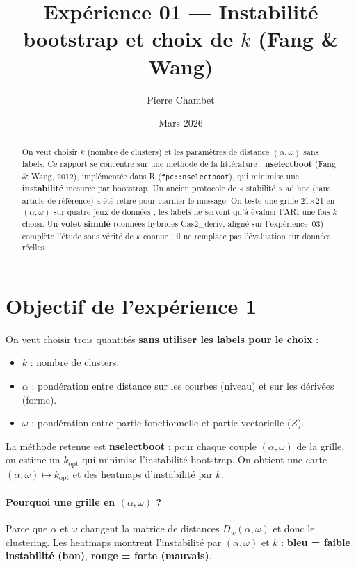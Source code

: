 \documentclass[11pt, a4paper]{article}
\title{Expérience 01 --- Instabilité bootstrap et choix de $k$ (Fang \& Wang)}
\author{Pierre Chambet}
\date{Mars 2026}
\begin{document}
\maketitle

\begin{abstract}
On veut choisir $k$ (nombre de clusters) et les paramètres de distance
$(\alpha,\omega)$ sans labels. Ce rapport se concentre sur une méthode de la
littérature : \textbf{nselectboot} (Fang \& Wang, 2012), implémentée dans R
(\texttt{fpc::nselectboot}), qui minimise une \textbf{instabilité} mesurée par
bootstrap. Un ancien protocole de « stabilité » ad hoc (sans article de référence)
a été retiré pour clarifier le message. On teste une grille 21×21 en
$(\alpha,\omega)$ sur quatre jeux de données ; les labels ne servent qu'à
évaluer l'ARI une fois $k$ choisi. Un \textbf{volet simulé} (données hybrides
Cas2\_deriv, aligné sur l'expérience~03) complète l'étude sous vérité de $k$
connue ; il ne remplace pas l'évaluation sur données réelles.
\end{abstract}

\tableofcontents
\newpage

\section{Objectif de l'expérience 1}

On veut choisir trois quantités \textbf{sans utiliser les labels pour le choix} :

\begin{itemize}
  \item \textbf{$k$} : nombre de clusters.
  \item \textbf{$\alpha$} : pondération entre distance sur les courbes (niveau)
    et sur les dérivées (forme).
  \item \textbf{$\omega$} : pondération entre partie fonctionnelle et partie
    vectorielle ($Z$).
\end{itemize}

La méthode retenue est \textbf{nselectboot} : pour chaque couple $(\alpha,\omega)$
de la grille, on estime un $k_\text{opt}$ qui minimise l'instabilité bootstrap.
On obtient une carte $(\alpha,\omega) \mapsto k_\text{opt}$ et des heatmaps
d'instabilité par $k$.

\paragraph{Pourquoi une grille en $(\alpha,\omega)$ ?}
Parce que $\alpha$ et $\omega$ changent la matrice de distances $D_w(\alpha,\omega)$
et donc le clustering. Les heatmaps montrent l'instabilité par $(\alpha,\omega)$
et $k$ : \textbf{bleu = faible instabilité (bon)}, \textbf{rouge = forte (mauvais)}.
\end{document}
